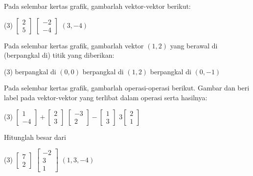 \begin{exercise}
Pada selembar kertas grafik, gambarlah vektor-vektor berikut:
\begin{tasks}(3)
\task
$\begin{bmatrix}
2 \\
5
\end{bmatrix}
$
\task
$\begin{bmatrix}
-2 \\
-4
\end{bmatrix}
$
\task
$(3,-4)$
\end{tasks}
\end{exercise}

\begin{exercise}
Pada selembar kertas grafik, gambarlah vektor $(1,2)$ yang berawal di (berpangkal di)
titik yang diberikan:
\begin{tasks}(3)
\task
berpangkal di $(0,0)$
\task
berpangkal di $(1,2)$
\task
berpangkal di $(0,-1)$
\end{tasks}
\end{exercise}

\begin{exercise}
Pada selembar kertas grafik, gambarlah operasi-operasi berikut.
Gambar dan beri label pada vektor-vektor yang terlibat dalam operasi
serta hasilnya:
\begin{tasks}(3)
\task
$\begin{bmatrix}
1 \\
-4
\end{bmatrix}
+
\begin{bmatrix}
2 \\
3
\end{bmatrix}$
\task
$\begin{bmatrix}
-3 \\
2
\end{bmatrix}
-
\begin{bmatrix}
1 \\
3
\end{bmatrix}$
\task
$3\begin{bmatrix}
2 \\
1
\end{bmatrix}$
\end{tasks}
\end{exercise}

\begin{exercise}
Hitunglah besar dari
\begin{tasks}(3)
\task
$\begin{bmatrix}
7 \\
2
\end{bmatrix}
$
\task
$\begin{bmatrix}
-2 \\
3 \\
1
\end{bmatrix}
$
\task
$(1,3,-4)$
\end{tasks}
\end{exercise}

